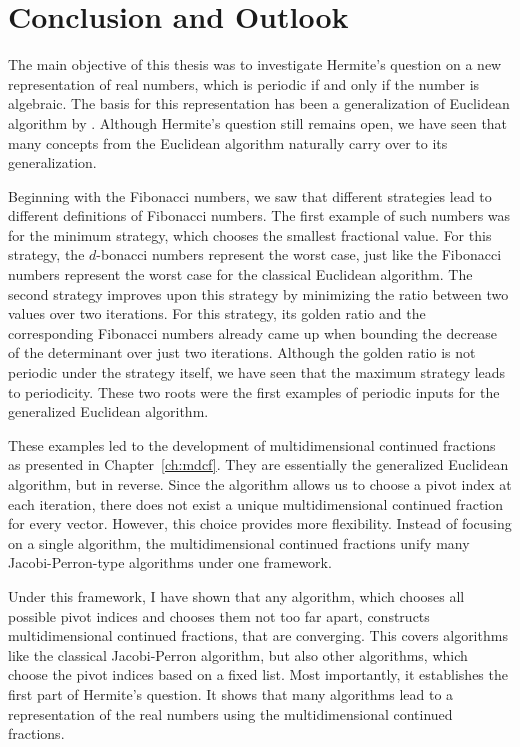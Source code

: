 \chapter{Conclusion and Outlook}
\label{ch:conclusion}

The main objective of this thesis
was to investigate Hermite's question
on a new representation of real numbers,
which is periodic if and only if the number is algebraic.
The basis for this representation has been a generalization of Euclidean
algorithm by \citeauthor{Klein24}.
Although Hermite's question still remains open,
we have seen that many concepts from the Euclidean algorithm naturally carry
over to its generalization.

Beginning with the Fibonacci numbers,
we saw that different strategies lead to different definitions of Fibonacci numbers.
The first example of such numbers was for the minimum strategy,
which chooses the smallest fractional value.
For this strategy, the $d$-bonacci numbers represent the worst case,
just like the Fibonacci numbers represent the worst case for the classical
Euclidean algorithm.
The second strategy improves upon this strategy by minimizing the ratio between two values over two iterations.
For this strategy, its golden ratio and the corresponding Fibonacci numbers
already came up when bounding the decrease of the determinant over just two iterations.
Although the golden ratio is not periodic under the strategy itself,
we have seen that the maximum strategy leads to periodicity.
These two roots were the first examples of periodic inputs for the generalized Euclidean algorithm.

These examples led to the development of multidimensional continued fractions
as presented in Chapter~\ref{ch:mdcf}.
They are essentially the generalized Euclidean algorithm, but in reverse.
Since the algorithm allows us to choose a pivot index at each iteration,
there does not exist a unique multidimensional continued fraction for every vector.
However, this choice provides more flexibility.
Instead of focusing on a single algorithm, the multidimensional continued
fractions unify many Jacobi-Perron-type algorithms under one framework.

Under this framework,
I have shown that any algorithm, which chooses all possible pivot indices and
chooses them not too far apart, constructs multidimensional continued fractions,
that are converging.
This covers algorithms like the classical Jacobi-Perron algorithm,
but also other algorithms, which choose the pivot indices based on a fixed list.
Most importantly, it establishes the first part of Hermite's question.
It shows that many algorithms lead to a representation of the real numbers
using the multidimensional continued fractions.

